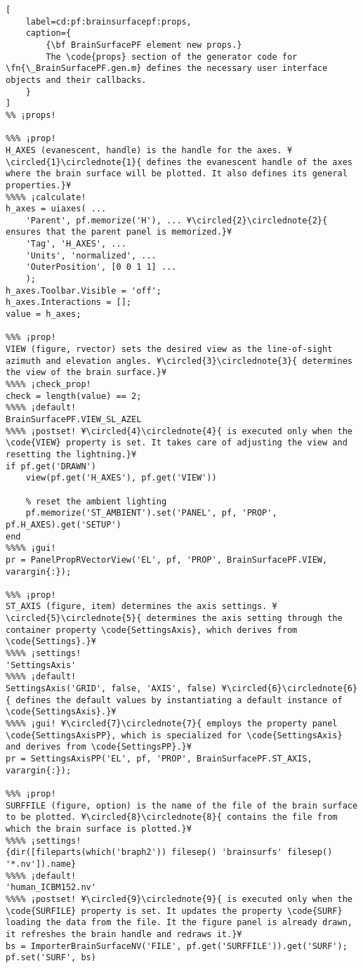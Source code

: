\documentclass{tufte-handout}
\begin{document}
\begin{lstlisting}[
	label=cd:pf:brainsurfacepf:props,
	caption={
		{\bf BrainSurfacePF element new props.}
		The \code{props} section of the generator code for \fn{\_BrainSurfacePF.gen.m} defines the necessary user interface objects and their callbacks.
	}
]
%% ¡props!

%%% ¡prop!
H_AXES (evanescent, handle) is the handle for the axes. ¥\circled{1}\circlednote{1}{ defines the evanescent handle of the axes where the brain surface will be plotted. It also defines its general properties.}¥
%%%% ¡calculate!
h_axes = uiaxes( ...
    'Parent', pf.memorize('H'), ... ¥\circled{2}\circlednote{2}{ ensures that the parent panel is memorized.}¥
    'Tag', 'H_AXES', ...
    'Units', 'normalized', ...
    'OuterPosition', [0 0 1 1] ...
    );
h_axes.Toolbar.Visible = 'off';
h_axes.Interactions = [];
value = h_axes;

%%% ¡prop!
VIEW (figure, rvector) sets the desired view as the line-of-sight azimuth and elevation angles. ¥\circled{3}\circlednote{3}{ determines the view of the brain surface.}¥
%%%% ¡check_prop!
check = length(value) == 2;
%%%% ¡default!
BrainSurfacePF.VIEW_SL_AZEL
%%%% ¡postset! ¥\circled{4}\circlednote{4}{ is executed only when the \code{VIEW} property is set. It takes care of adjusting the view and resetting the lightning.}¥
if pf.get('DRAWN')
    view(pf.get('H_AXES'), pf.get('VIEW'))
    
    % reset the ambient lighting
    pf.memorize('ST_AMBIENT').set('PANEL', pf, 'PROP', pf.H_AXES).get('SETUP')
end
%%%% ¡gui!
pr = PanelPropRVectorView('EL', pf, 'PROP', BrainSurfacePF.VIEW, varargin{:});

%%% ¡prop!
ST_AXIS (figure, item) determines the axis settings. ¥\circled{5}\circlednote{5}{ determines the axis setting through the container property \code{SettingsAxis}, which derives from \code{Settings}.}¥
%%%% ¡settings!
'SettingsAxis'
%%%% ¡default!
SettingsAxis('GRID', false, 'AXIS', false) ¥\circled{6}\circlednote{6}{ defines the default values by instantiating a default instance of \code{SettingsAxis}.}¥
%%%% ¡gui! ¥\circled{7}\circlednote{7}{ employs the property panel \code{SettingsAxisPP}, which is specialized for \code{SettingsAxis} and derives from \code{SettingsPP}.}¥
pr = SettingsAxisPP('EL', pf, 'PROP', BrainSurfacePF.ST_AXIS, varargin{:});

%%% ¡prop!
SURFFILE (figure, option) is the name of the file of the brain surface to be plotted. ¥\circled{8}\circlednote{8}{ contains the file from which the brain surface is plotted.}¥
%%%% ¡settings!
{dir([fileparts(which('braph2')) filesep() 'brainsurfs' filesep() '*.nv']).name}
%%%% ¡default!
'human_ICBM152.nv'
%%%% ¡postset! ¥\circled{9}\circlednote{9}{ is executed only when the \code{SURFILE} property is set. It updates the property \code{SURF} loading the data from the file. It the figure panel is already drawn, it refreshes the brain handle and redraws it.}¥
bs = ImporterBrainSurfaceNV('FILE', pf.get('SURFFILE')).get('SURF');
pf.set('SURF', bs)


\end{lstlisting}
\end{document}
